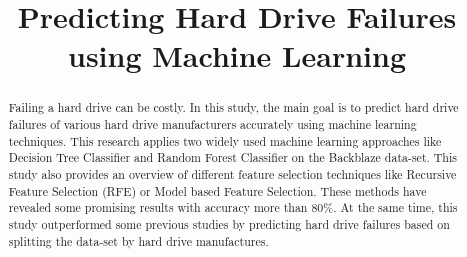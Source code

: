\documentclass[conference]{IEEEtran}
\begin{document}
\title{Predicting Hard Drive Failures using Machine Learning\\}



\author{
\and

\and

\and

\and

}

\maketitle

\begin{abstract}
Failing a hard drive can be costly. In this study, the main goal is to predict hard drive failures of various hard drive manufacturers accurately using machine learning techniques. This research applies two widely used machine learning approaches like Decision Tree Classifier and Random Forest Classifier on the Backblaze data-set. This study also provides an overview of different feature selection techniques like Recursive Feature Selection (RFE) or Model based Feature Selection. These methods have revealed some promising results with accuracy more than 80\%. At the same time, this study outperformed some previous studies by predicting hard drive failures based on splitting the data-set by hard drive manufactures.\\
\end{abstract}
\end{document}
